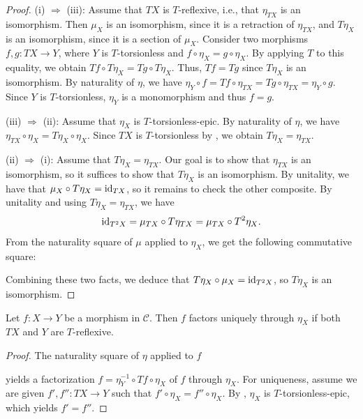 \begin{proof}
  (i) $\Rightarrow$ (iii): Assume that $TX$ is $T$-reflexive, i.e., that $\eta_{TX}$ is an isomorphism.
  Then $\mu_X$ is an isomorphism, since it is a retraction of $\eta_{TX}$,
  and $T\eta_X$ is an isomorphism, since it is a section of $\mu_X$.
  Consider two morphisms $f, g : TX \to Y$, where $Y$ is $T$-torsionless and $f \circ \eta_X = g \circ \eta_X$.
  By applying $T$ to this equality, we obtain $Tf \circ T\eta_X = Tg \circ T\eta_X$.
  Thus, $Tf = Tg$ since $T\eta_X$ is an isomorphism.
  By naturality of $\eta$, we have $\eta_Y \circ f = Tf \circ \eta_{TX} = Tg \circ \eta_{TX} = \eta_Y \circ g$.
  Since $Y$ is $T$-torsionless, $\eta_Y$ is a monomorphism and thus $f = g$.

  (iii) $\Rightarrow$ (ii):  Assume that $\eta_X$ is $T$-torsionless-epic.
  By naturality of $\eta$, we have $\eta_{TX} \circ \eta_X = T\eta_X \circ \eta_X$.
  Since $TX$ is $T$-torsionless by , we obtain $T\eta_X = \eta_{TX}$.

  (ii) $\Rightarrow$ (i): Assume that $T\eta_X = \eta_{TX}$.
  Our goal is to show that $\eta_{TX}$ is an isomorphism, so it suffices to show that $T\eta_X$ is an isomorphism.
  By unitality, we have that $\mu_X \circ T\eta_X = \mathrm{id}_{TX}$, so it remains to check the other composite.
  By unitality and using $T\eta_X = \eta_{TX}$, we have
  \[
    \mathrm{id}_{T^2X} = \mu_{TX} \circ T\eta_{TX} = \mu_{TX} \circ T^2\eta_{X} .
  \]
  From the naturality square of $\mu$ applied to $\eta_X$, we get the following commutative square:
  \begin{center}
  \end{center}
  Combining these two facts, we deduce that $T\eta_X \circ \mu_X = \mathrm{id}_{T^2X}$, so $T\eta_X$ is an isomorphism.
\end{proof}


\begin{proposition}\label{prp:monad-factorization}
  Let $f : X \to Y$ be a morphism in $\mathcal{C}$. Then $f$ factors uniquely through $\eta_X$ if both $TX$ and $Y$ are $T$-reflexive.
\end{proposition}

\begin{proof}
  The naturality square of $\eta$ applied to $f$
\begin{center}
\end{center}
  yields a factorization $f = \eta_Y^{-1} \circ T f \circ \eta_X$ of $f$ through $\eta_X$.
  For uniqueness, assume we are given $f', f'' : TX \to Y$ such that $f' \circ \eta_X = f'' \circ \eta_X$.
  By , $\eta_X$ is $T$-torsionless-epic, which yields $f' = f''$.
\end{proof}

